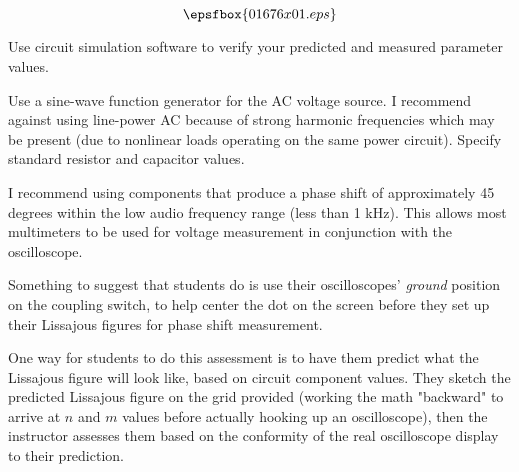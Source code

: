 

$$\epsfbox{01676x01.eps}$$

\vfil \eject






Use circuit simulation software to verify your predicted and measured parameter values.







Use a sine-wave function generator for the AC voltage source.  I recommend against using line-power AC because of strong harmonic frequencies which may be present (due to nonlinear loads operating on the same power circuit).  Specify standard resistor and capacitor values.

I recommend using components that produce a phase shift of approximately 45 degrees within the low audio frequency range (less than 1 kHz).  This allows most multimeters to be used for voltage measurement in conjunction with the oscilloscope.

Something to suggest that students do is use their oscilloscopes' {\it ground} position on the coupling switch, to help center the dot on the screen before they set up their Lissajous figures for phase shift measurement.

One way for students to do this assessment is to have them predict what the Lissajous figure will look like, based on circuit component values.  They sketch the predicted Lissajous figure on the grid provided (working the math "backward" to arrive at $n$ and $m$ values before actually hooking up an oscilloscope), then the instructor assesses them based on the conformity of the real oscilloscope display to their prediction.




